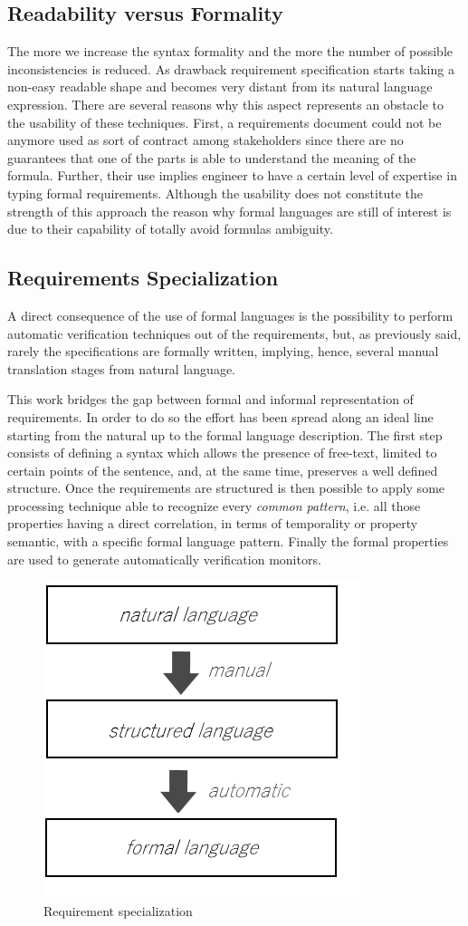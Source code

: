 \subsection{Readability versus Formality}
The more we increase the syntax formality and the more the number of possible inconsistencies is reduced. As drawback requirement specification starts taking a non-easy readable shape and becomes very distant from its natural language expression. There are several reasons why this aspect represents an obstacle to the usability of these techniques. First, a requirements document could not be anymore used as sort of contract among stakeholders since there are no guarantees that one of the parts is able to understand the meaning of the formula. Further, their use implies engineer to have a certain level of expertise in typing formal requirements. Although the usability does not constitute the strength of this approach the reason why formal languages are still of interest is due to their capability of totally avoid formulas ambiguity.

\subsection{Requirements Specialization}
A direct consequence of the use of formal languages is the possibility to perform automatic verification techniques out of the requirements, but, as previously said, rarely the specifications are formally written, implying, hence, several manual translation stages from natural language. 
\par This work bridges the gap between formal and informal representation of requirements. In order to do so the effort has been spread along an ideal line starting from the natural up to the formal language description. The first step consists of defining a syntax which allows the presence of free-text, limited to certain points of the sentence, and, at the same time, preserves a well defined structure. Once the requirements are structured is then possible to apply some processing technique able to recognize every \textit{common pattern}, i.e. all those properties having a direct correlation, in terms of temporality or property semantic, with a specific formal language pattern. Finally the formal properties are used to generate automatically verification monitors.
\begin{figure}[!h]
	\centering 
     \includegraphics[width=.4\textwidth]{Figs/specialization.png} 
     \caption{Requirement specialization} 
     \label{fig:reqspec} 
\end{figure} 
 
